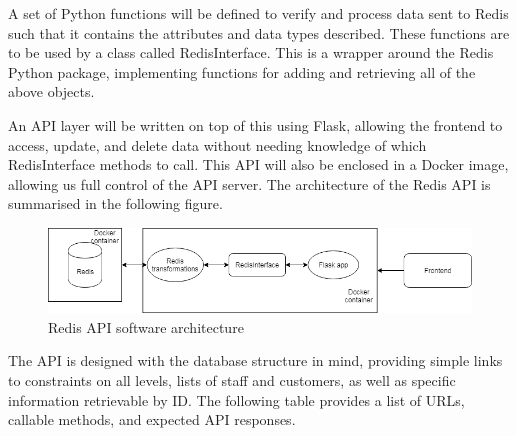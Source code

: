 A set of Python functions will be defined to verify and process data sent to Redis such that it contains the attributes and data types described. These functions are to be used by a class called RedisInterface. This is a wrapper around the Redis Python package, implementing functions for adding and retrieving all of the above objects.

An API layer will be written on top of this using Flask, allowing the frontend to access, update, and delete data without needing knowledge of which RedisInterface methods to call. This API will also be enclosed in a Docker image, allowing us full control of the API server. The architecture of the Redis API is summarised in the following figure.

\begin{figure}[h]
    \centering
    \includegraphics[scale=0.5]{redis_backend_diagram.png}
    \caption{Redis API software architecture}
    \label{fig:redis_architecturel}
\end{figure}

The API is designed with the database structure in mind, providing simple links to constraints on all levels, lists of staff and customers, as well as specific information retrievable by ID. The following table provides a list of URLs, callable methods, and expected API responses.

